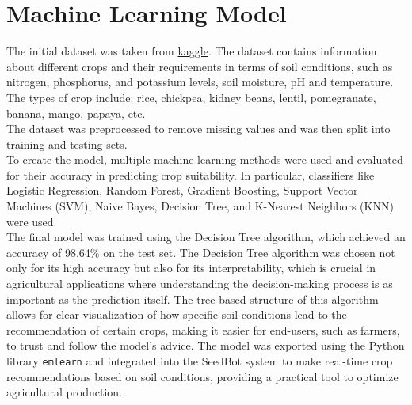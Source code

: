 \chapter{Machine Learning Model}

The initial dataset was taken from \href{https://www.kaggle.com/code/mdshariaremonshaikat/optimizing-agricultural-production-with-7-ml-model/input}{kaggle}. The dataset contains information about different crops and their requirements in terms of soil conditions, such as nitrogen, phosphorus, and potassium levels, soil moisture, pH and temperature. 
The types of crop include: rice, chickpea, kidney beans, lentil, pomegranate, banana, mango, papaya, etc.\\
The dataset was preprocessed to remove missing values and was then split into training and testing sets.\\
To create the model, multiple machine learning methods were used and evaluated for their accuracy in predicting crop suitability. In particular, classifiers like Logistic Regression, Random Forest, Gradient Boosting, Support Vector Machines (SVM), Naive Bayes, Decision Tree, and K-Nearest Neighbors (KNN) were used.\\
The final model was trained using the Decision Tree algorithm, which achieved an accuracy of 98.64\% on the test set.
The Decision Tree algorithm was chosen not only for its high accuracy but also for its interpretability, which is crucial in agricultural applications where understanding the decision-making process is as important as the prediction itself. The tree-based structure of this algorithm allows for clear visualization of how specific soil conditions lead to the recommendation of certain crops, making it easier for end-users, such as farmers, to trust and follow the model's advice.
The model was exported using the Python library \texttt{emlearn} and integrated into the SeedBot system to make real-time crop recommendations based on soil conditions, providing a practical tool to optimize agricultural production.


